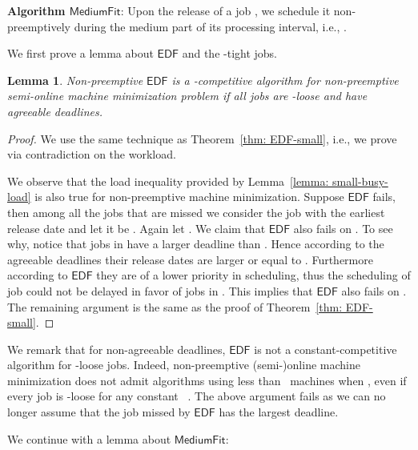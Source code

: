 \documentclass[letterpaper,11pt]{article}
\newtheorem{lemma}{Lemma}
\newcommand{\EDF}{\ensuremath{\mathsf{EDF}}\xspace}
\newcommand{\Mediumfit}{\ensuremath{\mathsf{MediumFit}}\xspace}
\begin{document}
\medskip
{\bf Algorithm \Mediumfit}:
Upon the release of a job , we schedule it non-preemptively during the medium part of its processing interval, i.e., .
\medskip

We first prove a lemma about \EDF and the -tight jobs.

\begin{lemma}\label{lemma:agreeable-loose-edf}
  Non-preemptive \EDF is a -competitive algorithm for non-preemptive semi-online machine minimization problem if all jobs are -loose and have agreeable deadlines.
\end{lemma} 
\begin{proof}
We use the same technique as Theorem~\ref{thm: EDF-small}, i.e., we prove via contradiction on the workload.

We observe that the load inequality provided by Lemma~\ref{lemma: small-busy-load} is also true for non-preemptive machine minimization. Suppose \EDF fails, then among all the jobs that are missed we consider the job with the earliest release date and let it be . Again let . We claim that \EDF also fails on . To see why, notice that jobs in  have a larger deadline than . Hence according to the agreeable deadlines their release dates are larger or equal to . Furthermore according to \EDF they are of a lower priority in scheduling, thus the scheduling of job  could not be delayed in favor of jobs in . This implies that \EDF also fails on . The remaining argument is the same as the proof of Theorem~\ref{thm: EDF-small}. 
\end{proof}

We remark that for non-agreeable deadlines, \EDF is not a constant-competitive algorithm for -loose jobs. Indeed, non-preemptive \mbox{(semi-)online} machine minimization does not admit algorithms using less than~ machines when ,  even if every job is -loose for any constant ~\cite{Saha13}. The above argument fails as we can no longer assume that the job  missed by \EDF has the largest deadline. 

We continue with a lemma about \Mediumfit:
\end{document}
